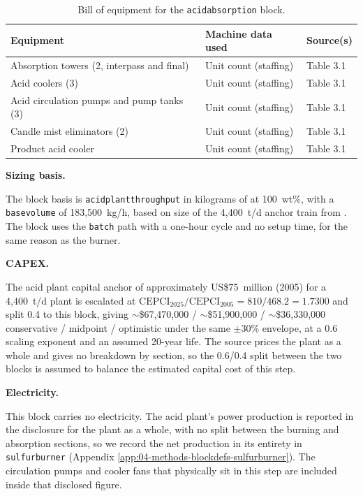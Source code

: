 \documentclass{article}
\renewcommand\_{\textunderscore\allowbreak}
\begin{document}
\begin{table}[h!]
\caption{Bill of equipment for the \texttt{acid\_absorption} block.}
\label{tab:c-equip-acidabsorption}
\centering
\begin{tabular}{>{\raggedright\arraybackslash}p{5.2cm}
                >{\raggedright\arraybackslash}p{4cm}
                >{\raggedright\arraybackslash}p{4.5cm}}
\toprule
\textbf{Equipment} & \textbf{Machine data used} & \textbf{Source(s)} \\
\midrule
Absorption towers (2, interpass and final) & Unit count (staffing) & Table 3.1 \\
Acid coolers (3) & Unit count (staffing) & Table 3.1 \\
Acid circulation pumps and pump tanks (3) & Unit count (staffing) & Table 3.1 \\
Candle mist eliminators (2) & Unit count (staffing) & Table 3.1 \\
Product acid cooler & Unit count (staffing) & Table 3.1 \\
\bottomrule
\end{tabular}
\end{table}

\medskip
\noindent\textbf{Sizing basis.}\quad
 
The block basis is \texttt{acid\_plant\_throughput} in kilograms of  at 100~wt\%, with a \texttt{base\_volume} of 183,500~kg/h, based on size of the 4,400~t/d anchor train from \citet{davenportSulfuricAcidManufacture2006}. The block uses the \texttt{batch} path with a one-hour cycle and no setup time, for the same reason as the burner. 

\medskip
\noindent\textbf{CAPEX.}\quad
 
The acid plant capital anchor of approximately US\$75~million (2005) for a 4,400~t/d plant \cite{davenportSulfuricAcidManufacture2006} is escalated at $\text{CEPCI}_{2025}/\text{CEPCI}_{2005} = 810/468.2 = 1.7300$ and split 0.4 to this block, giving $\sim$\$67,470,000 / $\sim$\$51,900,000 / $\sim$\$36,330,000 conservative / midpoint / optimistic under the same $\pm$30\% envelope, at a 0.6 scaling exponent and an assumed 20-year life. The source prices the plant as a whole and gives no breakdown by section, so the 0.6/0.4 split between the two blocks is assumed to balance the estimated capital cost of this step. 

\medskip
\noindent\textbf{Electricity.}\quad
 
This block carries no electricity. The acid plant's power production is reported in the disclosure for the plant as a whole, with no split between the burning and absorption sections, so we record the net production in its entirety in \texttt{sulfur\_burner} (Appendix \ref{app:04-methods-blockdefs-sulfurburner}). The circulation pumps and cooler fans that physically sit in this step are included inside that disclosed figure.
\end{document}
